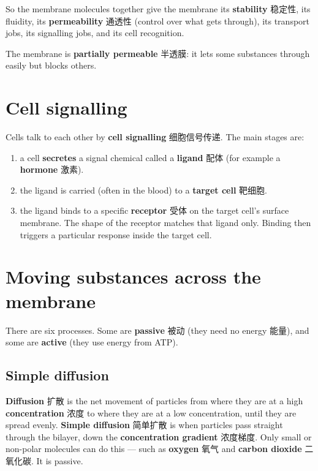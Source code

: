 \documentclass[11pt]{article}
\begin{document}
So the membrane molecules together give the membrane its \textbf{stability} 稳定性, its fluidity, its \textbf{permeability} 通透性 (control over what gets through), its transport jobs, its signalling jobs, and its cell recognition.

The membrane is \textbf{partially permeable} 半透膜: it lets some substances through easily but blocks others.

\section*{Cell signalling}

Cells talk to each other by \textbf{cell signalling} 细胞信号传递. The main stages are:

\begin{enumerate}
\item a cell \textbf{secretes} a signal chemical called a \textbf{ligand} 配体 (for example a \textbf{hormone} 激素).

\item the ligand is carried (often in the blood) to a \textbf{target cell} 靶细胞.

\item the ligand binds to a specific \textbf{receptor} 受体 on the target cell's surface membrane. The shape of the receptor matches that ligand only. Binding then triggers a particular response inside the target cell.

\end{enumerate}

\section*{Moving substances across the membrane}

There are six processes. Some are \textbf{passive} 被动 (they need no energy 能量), and some are \textbf{active} (they use energy from ATP).

\subsection*{Simple diffusion}

\textbf{Diffusion} 扩散 is the net movement of particles from where they are at a high \textbf{concentration} 浓度 to where they are at a low concentration, until they are spread evenly. \textbf{Simple diffusion} 简单扩散 is when particles pass straight through the bilayer, down the \textbf{concentration gradient} 浓度梯度. Only small or non-polar molecules can do this — such as \textbf{oxygen} 氧气 and \textbf{carbon dioxide} 二氧化碳. It is passive.
\end{document}
